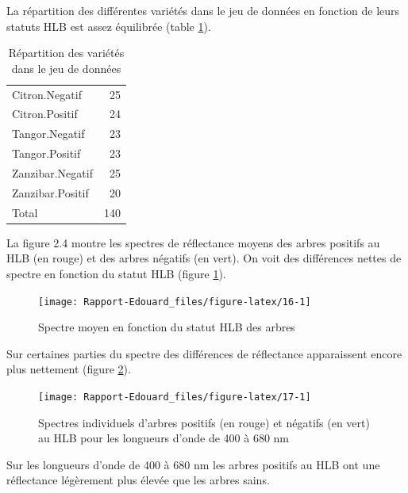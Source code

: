 \documentclass[
  11pt,
  french,
  a4paper,
  extrafontsizes,onecolumn,openright
  ]{memoir}
\begin{document}
La répartition des différentes variétés dans le jeu de données en fonction de leurs statuts HLB est assez équilibrée (table \ref{tab:T1}).

\scriptsize

\begin{longtable}[t]{lr}
\caption{\label{tab:T1}Répartition des variétés dans le jeu de données}\\
\toprule
Citron.Negatif & 25\\
Citron.Positif & 24\\
Tangor.Negatif & 23\\
Tangor.Positif & 23\\
Zanzibar.Negatif & 25\\
\addlinespace
Zanzibar.Positif & 20\\
Total & 140\\
\bottomrule
\end{longtable}

\normalsize

La figure 2.4 montre les spectres de réflectance moyens des arbres positifs au HLB (en rouge) et des arbres négatifs (en vert). On voit des différences nettes de spectre en fonction du statut HLB (figure \ref{fig:16}).

\scriptsize

\begin{figure}

{\centering \texttt{[image: Rapport-Edouard\_files/figure-latex/16-1]} 

}

\caption{Spectre moyen en fonction du statut HLB des arbres}\label{fig:16}
\end{figure}

\normalsize

Sur certaines parties du spectre des différences de réflectance apparaissent encore plus nettement (figure \ref{fig:17}).

\scriptsize

\begin{figure}

{\centering \texttt{[image: Rapport-Edouard\_files/figure-latex/17-1]} 

}

\caption{Spectres individuels d’arbres positifs (en rouge) et négatifs (en vert) au HLB pour les longueurs d'onde de 400 à 680 nm}\label{fig:17}
\end{figure}

\normalsize

Sur les longueurs d'onde de 400 à 680 nm les arbres positifs au HLB ont une réflectance légèrement plus élevée que les arbres sains.
\end{document}
